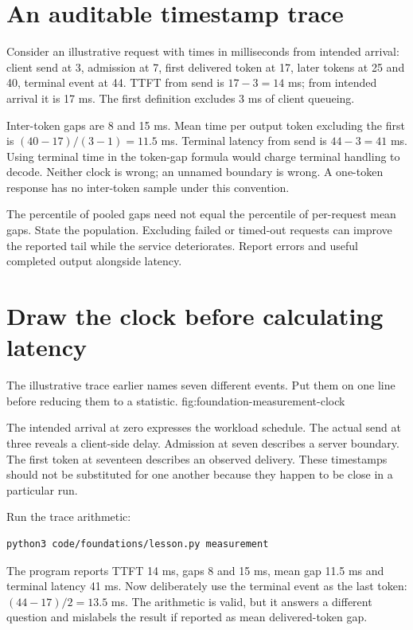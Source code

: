 \section{An auditable timestamp trace}
Consider an illustrative request with times in milliseconds from intended
arrival: client send at 3, admission at 7, first delivered token at 17,
later tokens at 25 and 40, terminal event at 44.
TTFT from send is $17-3=14$ ms; from intended arrival it is 17 ms.
The first definition excludes 3 ms of client queueing.

Inter-token gaps are 8 and 15 ms. Mean time per output token excluding
the first is $(40-17)/(3-1)=11.5$ ms.
Terminal latency from send is $44-3=41$ ms. Using terminal time in the
token-gap formula would charge terminal handling to decode. Neither clock
is wrong; an unnamed boundary is wrong. A one-token response has no
inter-token sample under this convention.

The percentile of pooled gaps need not equal the percentile of per-request
mean gaps. State the population. Excluding failed or timed-out requests
can improve the reported tail while the service deteriorates.
Report errors and useful completed output alongside latency.

\section{Draw the clock before calculating latency}
The illustrative trace earlier names seven different events. Put them
on one line before reducing them to a statistic.
{fig:foundation-measurement-clock}

The intended arrival at zero expresses the workload schedule.
The actual send at three reveals a client-side delay. Admission at
seven describes a server boundary. The first token at seventeen
describes an observed delivery. These timestamps should not be
substituted for one another because they happen to be close in a
particular run.

Run the trace arithmetic:
\begin{verbatim}
python3 code/foundations/lesson.py measurement
\end{verbatim}
The program reports TTFT 14 ms, gaps 8 and 15 ms, mean gap 11.5 ms
and terminal latency 41 ms. Now deliberately use the terminal event
as the last token: $(44-17)/2=13.5$ ms. The arithmetic is valid,
but it answers a different question and mislabels the result if
reported as mean delivered-token gap.


